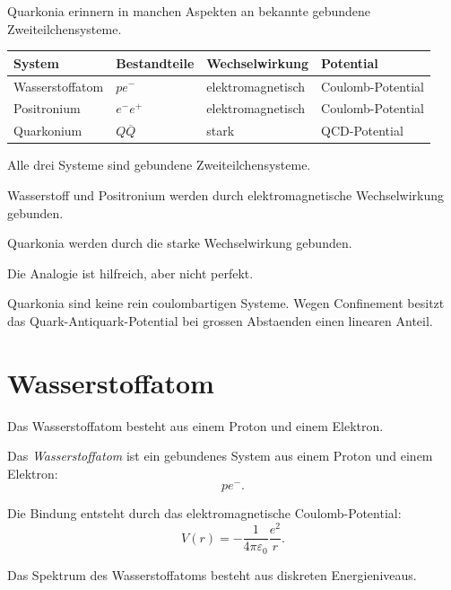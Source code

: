 Quarkonia erinnern in manchen Aspekten an bekannte gebundene Zweiteilchensysteme.

\begin{center}
\begin{tabular}{|p{3.5cm}|p{3.4cm}|p{3.8cm}|p{3.5cm}|}
\hline
System & Bestandteile & Wechselwirkung & Potential \\
\hline
Wasserstoffatom & $p e^-$ & elektromagnetisch & Coulomb-Potential \\
\hline
Positronium & $e^- e^+$ & elektromagnetisch & Coulomb-Potential \\
\hline
Quarkonium & $Q\overline{Q}$ & stark & QCD-Potential \\
\hline
\end{tabular}
\end{center}

\begin{conceptbox}
Alle drei Systeme sind gebundene Zweiteilchensysteme.

Wasserstoff und Positronium werden durch elektromagnetische Wechselwirkung gebunden.

Quarkonia werden durch die starke Wechselwirkung gebunden.
\end{conceptbox}

\begin{examtipbox}
Die Analogie ist hilfreich, aber nicht perfekt.

Quarkonia sind keine rein coulombartigen Systeme.
Wegen Confinement besitzt das Quark-Antiquark-Potential bei grossen Abstaenden einen
linearen Anteil.
\end{examtipbox}

\section{Wasserstoffatom}

Das Wasserstoffatom besteht aus einem Proton und einem Elektron.

\begin{definitionbox}
Das \emph{Wasserstoffatom} ist ein gebundenes System aus einem Proton und einem
Elektron:
\[
    p e^-.
\]
\end{definitionbox}

\begin{conceptbox}
Die Bindung entsteht durch das elektromagnetische Coulomb-Potential:
\[
    V(r)
    =
    -\frac{1}{4\pi\varepsilon_0}
    \frac{e^2}{r}.
\]

Das Spektrum des Wasserstoffatoms besteht aus diskreten Energieniveaus.
\end{conceptbox}

